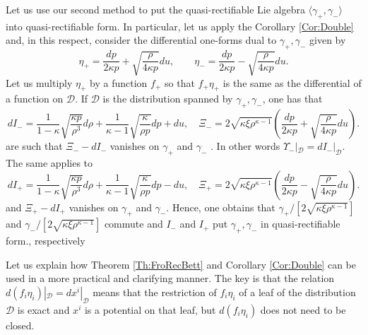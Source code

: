 \documentclass[12pt]{article}
\theoremstyle{plain}
\theoremstyle{definition}
\numberwithin{equation}{section}
\begin{document}
Let us use our second method to put the quasi-rectifiable Lie algebra $\langle\gamma_+,\gamma_-\rangle$  into quasi-rectifiable form. In particular, let us apply the Corollary \ref{Cor:Double} and, in this respect, consider the differential one-forms dual to $\gamma_+,\gamma_-$ given by
$$
\eta_+=\frac{dp}{2 \kappa p} +\sqrt{\frac{\rho}{4 \kappa p}}du,\qquad \eta_-=\frac{dp}{2 \kappa p}-\sqrt{\frac{\rho}{4 \kappa p}}du. %
$$
Let us multiply $\eta_+$ by a function $f_+$ so that $f_+ \eta_+$ is the same as the differential of a function on $\mathcal{D}$. 
If $\mathcal{D}$ is the distribution spanned by $\gamma_+,\gamma_-$, one has that 
$$
dI_-=\frac{1}{1-\kappa}\sqrt{\frac{\kappa p}{\rho^3}}d\rho+\frac{1}{\kappa-1}\sqrt{\frac{\kappa}{\rho p}}dp+du,\quad \Xi_-={2\sqrt{\kappa \xi\rho^{\kappa-1}}}\left(\frac{dp}{2 \kappa p} +\sqrt{\frac{\rho}{4 \kappa p}}du\right).
$$
are such that $\Xi_--dI_-$ vanishes on $\gamma_+$ and $\gamma_-$ . In other words $\Upsilon_-|_{\mathcal{D}}=dI_-|_{\mathcal{D}}$. The same applies to 
$$
dI_+=\frac{1}{1-\kappa}\sqrt{\frac{\kappa p}{\rho^3}}d\rho+\frac{1}{\kappa-1}\sqrt{\frac{\kappa}{\rho p}}dp-du,\quad \Xi_+={2\sqrt{\kappa \xi\rho^{\kappa-1}}}\left(\frac{dp}{2 \kappa p} -\sqrt{\frac{\rho}{4 \kappa p}}du\right).
$$
and $\Xi_+-dI_+$ vanishes on $\gamma_+$ and $\gamma_-$. Hence, one obtains that $\gamma_+/[2\sqrt{\kappa \xi\rho^{\kappa-1}}]$ and $\gamma_-/[2\sqrt{\kappa \xi\rho^{\kappa-1}}]$ commute and $I_-$ and $I_+$ put $\gamma_+,\gamma_-$ in quasi-rectifiable form., respectively 

Let us explain how Theorem \ref{Th:FroRecBett} and Corollary \ref{Cor:Double} can be used in a more practical and clarifying manner. The key is that the relation $d(f_i\eta_i)|_\mathcal{D}=dx^i|_\mathcal{D}$ means that the restriction of $f_i\eta_i$ of a leaf of the distribution $\mathcal{D}$ is exact and $x^i$ is a potential on that leaf, but $d(f_i\eta_i)$ does not need to be closed. 
\end{document}

